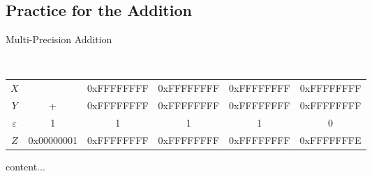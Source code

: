 \subsection{Practice for the Addition}

\begin{algorithm}[H]
\DontPrintSemicolon
\caption{Multi-Precision Addition}
\BlankLine
{}
\end{algorithm}
\begin{example}
\ \begin{table}[h!]\centering\renewcommand{\arraystretch}{1.25}
	{\ttfamily\begin{tabular*}{\textwidth}{@{\extracolsep{\fill}}cccccc}
	$X$ & & 0xFFFFFFFF & 0xFFFFFFFF & 0xFFFFFFFF & 0xFFFFFFFF \\
	$Y$ & + & 0xFFFFFFFF & 0xFFFFFFFF & 0xFFFFFFFF & 0xFFFFFFFF \\
	$\varepsilon$ & 1 & 1 & 1 & 1 & 0 \\ \cline{2-6}
	$Z$ & 0x00000001 & 0xFFFFFFFF & 0xFFFFFFFF & 0xFFFFFFFF & 0xFFFFFFFE \\
	\end{tabular*}}
\end{table}
\end{example}

\begin{note}
	content...
\end{note}

